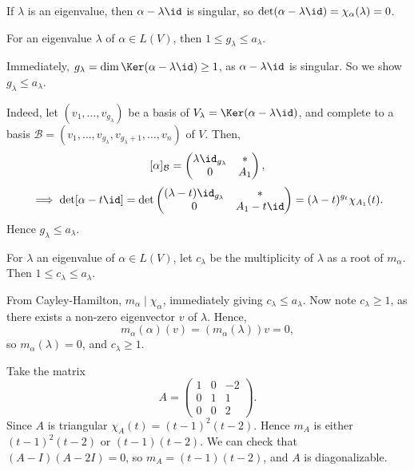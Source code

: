 \documentclass[12pt]{article}
\begin{document}
\begin{remark}
	If $\lambda$ is an eigenvalue, then $\alpha - \lambda \id$ is singular, so $\det(\alpha - \lambda \id) = \chi_{\alpha}(\lambda) = 0$.
\end{remark}

\begin{lemma}
	For an eigenvalue $\lambda$ of $\alpha \in L(V)$, then $1 \leq g_{\lambda} \leq a_{\lambda}$.
\end{lemma}

\begin{proofbox}
	Immediately, $g_{\lambda} = \dim \Ker(\alpha - \lambda \id) \geq 1$, as $\alpha - \lambda \id$ is singular. So we show $g_{\lambda} \leq a_{\lambda}$.

	Indeed, let $(v_1, \ldots, v_{g_{\lambda}})$ be a basis of $V_{\lambda} = \Ker(\alpha - \lambda \id)$, and complete to a basis $\mathcal{B} = (v_1, \ldots, v_{g_{\lambda}}, v_{g_{\lambda} + 1}, \ldots, v_n)$ of $V$. Then,
	\[
		[\alpha]_{\mathcal{B}} =
		\begin{pmatrix}
			\lambda \id_{g_{\lambda}} & \ast \\
			0 & A_1
		\end{pmatrix}
	,\]
	\[
		\implies \det[\alpha - t \id] = \det
		\begin{pmatrix}
			(\lambda - t) \id_{g_{\lambda}} & \ast \\
			0 & A_1 - t \id
		\end{pmatrix}
		= (\lambda - t)^{g_t} \chi_{A_1}(t)
	.\]
	Hence $g_{\lambda} \leq a_{\lambda}$.
\end{proofbox}

\begin{lemma}
	For $\lambda$ an eigenvalue of $\alpha \in L(V)$, let $c_{\lambda}$ be the multiplicity of $\lambda$ as a root of $m_{\alpha}$. Then $1 \leq c_{\lambda} \leq a_{\lambda}$.
\end{lemma}

\begin{proofbox}
	From Cayley-Hamilton, $m_{\alpha} \mid \chi_{\alpha}$, immediately giving $c_{\lambda} \leq a_{\lambda}$. Now note $c_{\lambda} \geq 1$, as there exists a non-zero eigenvector $v$ of $\lambda$. Hence,
	\[
		m_{\alpha}(\alpha)(v) = (m_{\alpha}(\lambda))v = 0
	,\]
	so $m_{\alpha}(\lambda) = 0$, and $c_{\lambda} \geq 1$.
\end{proofbox}

\begin{exbox}
	Take the matrix
	\[
	A =
	\begin{pmatrix}
		1 & 0 & -2 \\
		0 & 1 & 1 \\
		0 & 0 & 2
	\end{pmatrix}
	.\]
	Since $A$ is triangular $\chi_{A}(t) = (t - 1)^2(t - 2)$. Hence $m_{A}$ is either $(t - 1)^2(t - 2)$ or $(t - 1)(t - 2)$. We can check that $(A - I)(A - 2I) = 0$, so $m_{A} = (t - 1)(t - 2)$, and $A$ is diagonalizable.
\end{exbox}

\newpage

\printindex
\end{document}
